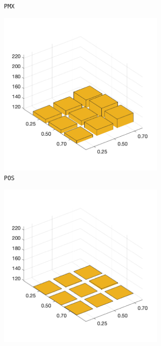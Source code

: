 \begin{figure}[H]
\begin{subfigure}[b]{0.25\textwidth}
		\caption{\texttt{PMX}}
		\label{fig:z}
    	\end{subfigure}
%
	\begin{subfigure}[b]{0.25\textwidth}
		\centering
		\includegraphics[width=0.9\textwidth]{crossover/min/cross_position_based_3.png}
		\caption{\texttt{POS}}
		\label{fig:x}
    	\end{subfigure}
%
	\begin{subfigure}[b]{0.25\textwidth}
		\centering
		\includegraphics[width=0.9\textwidth]{crossover/min/cross_seq_constructive_3.png}

\end{subfigure}
\end{figure}
